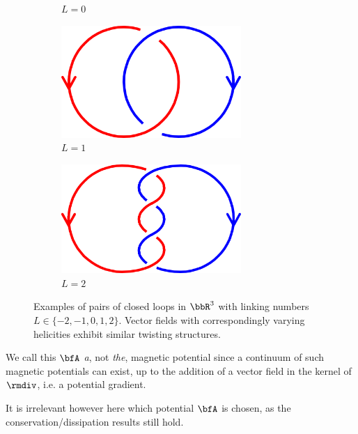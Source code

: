 \begin{figure}[!ht]
\begin{subfigure}{0.2634\textwidth}
            \caption{$L = 0$}
        \end{subfigure}%
        \begin{subfigure}{0.1815\textwidth}
            \centering
            \includegraphics[width = 0.75\textwidth]{2 - fluid component/3 - MHD structures/2 - global/images/1.png}
            \caption{$L = 1$}
        \end{subfigure}%
        \begin{subfigure}{0.1872\textwidth}
            \centering
            \includegraphics[width = 0.75\textwidth]{2 - fluid component/3 - MHD structures/2 - global/images/2.png}
            \caption{$L = 2$}
        \end{subfigure}
        \caption{Examples of pairs of closed loops in $\bbR^{3}$ with linking numbers $L  \in  \{-2, -1, 0, 1, 2\}$. Vector fields with correspondingly varying helicities exhibit similar twisting structures.}
        \label{fig:linking numbers}
    \end{figure}
    
    \begin{remark}
        We call this $\bfA$ \emph{a}, not \emph{the}, magnetic potential since a continuum of such magnetic potentials can exist, up to the addition of a vector field in the kernel of $\rmdiv$, i.e. a potential gradient.
        
        It is irrelevant however here which potential $\bfA$ is chosen, as the conservation/dissipation results still hold.
    \end{remark}

